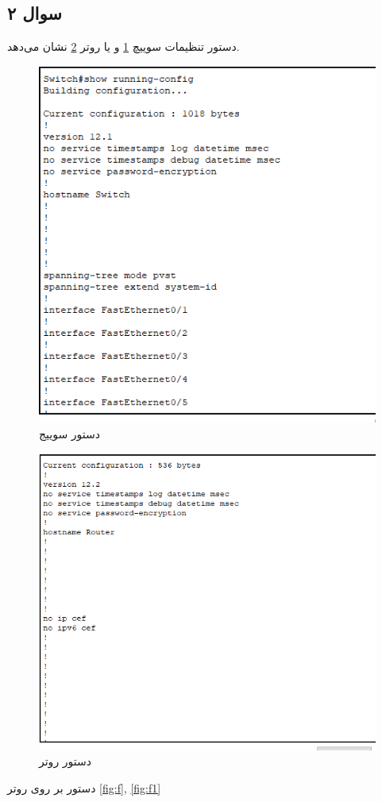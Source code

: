 \documentclass{perassignments}
\begin{document}
	\subsection{سوال ۲}
	دستور 
	تنظیمات سوییچ 
	\ref{fig:d}
	و یا روتر
	\ref{fig:e}
	 نشان می‌دهد.
	 \begin{figure}[H]
	 	\centering
	 	\includegraphics[width= 0.7\linewidth]{graphics/d.png}
	 	\caption{دستور 	 سوییج}
	 	\label{fig:d}
	 \end{figure}
	 \begin{figure}[H]
	 	\centering
	 	\includegraphics[width= 0.7\linewidth]{graphics/e.png}
	 	\caption{دستور 	 روتر}
	 	\label{fig:e}
	 \end{figure}
	 دستور 
	 بر روی روتر 
	 \ref{fig:f}, \ref{fig:f1}
\end{document}
